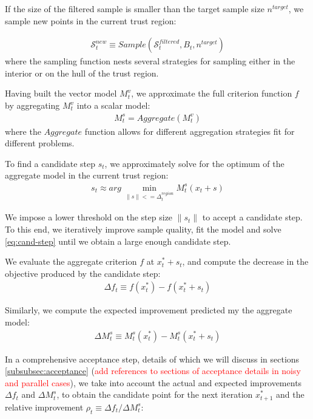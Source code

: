 If the size of the filtered sample is smaller than the target sample size $n^{target}$, we sample new points in the current trust region:

\begin{align}
    \mathcal{S}^{new}_{t}\equiv Sample(\mathcal{S}_t^{filtered},B_t,n^{target})
    \label{eq:sample-points}
\end{align}
where the sampling function nests several strategies for sampling either in the interior or on the hull of the trust region.

Having built the vector model $M_t^v$, we approximate the full criterion function $f$ by aggregating $M_t^v$ into a scalar model:
\begin{align}
    M_t^s = Aggregate(M_t^v)
\end{align}
where the $Aggregate$ function allows for different aggregation strategies fit for different problems.

To find a candidate step $s_t$, we approximately solve for the optimum of the aggregate model in the current trust region:
\begin{align}
    s_t\approx arg\,\min\limits_{\lVert s\rVert<=\Delta_t^{region}}M_t^s(x_t+s)
    \label{eq:cand-step}
\end{align}

We impose a lower threshold on the step size $\lVert s_t\rVert$ to accept a candidate step. To this end, we iteratively improve sample quality, fit the model and solve \ref{eq:cand-step} until we obtain a large enough candidate step.

We evaluate the aggregate criterion $f$ at $x^{*}_t+s_t$, and compute the decrease in the objective produced by the candidate step:
\begin{align}
    \Delta f_t\equiv f(x_t^*) - f(x_t^*+s_t)
    \label{eq:actual-improvement}
\end{align}

Similarly, we compute the expected improvement predicted my the aggregate model:
\begin{align}
    \Delta M^{s}_t\equiv M_t^s(x_t^*) - M_t^s(x_t^*+s_t)
    \label{eq:expected-improvement}
\end{align}

In a comprehensive acceptance step, details of which we will discuss in sections \ref{subsubsec:acceptance} (\textcolor{red}{add references to sections of acceptance details in noisy and parallel cases}), we take into account the actual and expected improvements $\Delta f_t$ and $\Delta M_t^s$, to obtain the candidate point for the next iteration $x_{t+1}^*$ and the relative improvement $\rho_t\equiv \Delta f_t/ \Delta M^s_t$:

